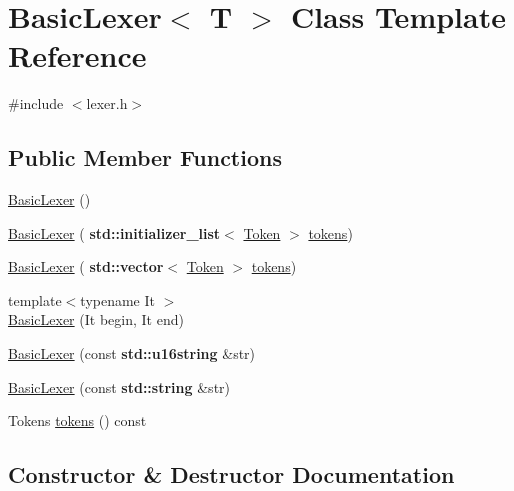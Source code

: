 \hypertarget{class_basic_lexer}{}\section{Basic\+Lexer$<$ T $>$ Class Template Reference}
\label{class_basic_lexer}


{\ttfamily \#include $<$lexer.\+h$>$}

\subsection*{Public Member Functions}
\begin{DoxyCompactItemize}
\item 
\hyperlink{class_basic_lexer_abc267aed0ef7227486b932f13b2917f0}{Basic\+Lexer} ()
\item 
\hyperlink{class_basic_lexer_a58d2038fb47025d4e32c20750e713b43}{Basic\+Lexer} (\textbf{ std\+::initializer\+\_\+list}$<$ \hyperlink{class_token}{Token} $>$ \hyperlink{class_basic_lexer_ac20fdf19d5602c563b5cad2bae3ad803}{tokens})
\item 
\hyperlink{class_basic_lexer_a1fd5d2795464497ffbe2bf61c892d619}{Basic\+Lexer} (\textbf{ std\+::vector}$<$ \hyperlink{class_token}{Token} $>$ \hyperlink{class_basic_lexer_ac20fdf19d5602c563b5cad2bae3ad803}{tokens})
\item 
{\footnotesize template$<$typename It $>$ }\\\hyperlink{class_basic_lexer_a7b8cb3ec8ba1ef5567bd280800f891f8}{Basic\+Lexer} (It begin, It end)
\item 
\hyperlink{class_basic_lexer_aee8242905dd2c3541322900bdd05a7b7}{Basic\+Lexer} (const \textbf{ std\+::u16string} \&str)
\item 
\hyperlink{class_basic_lexer_ab486a96453887dc7f9efd08c518ae0b0}{Basic\+Lexer} (const \textbf{ std\+::string} \&str)
\item 
Tokens \hyperlink{class_basic_lexer_ac20fdf19d5602c563b5cad2bae3ad803}{tokens} () const
\end{DoxyCompactItemize}


\subsection{Constructor \& Destructor Documentation}
\mbox{\label{class_basic_lexer_abc267aed0ef7227486b932f13b2917f0}} 
